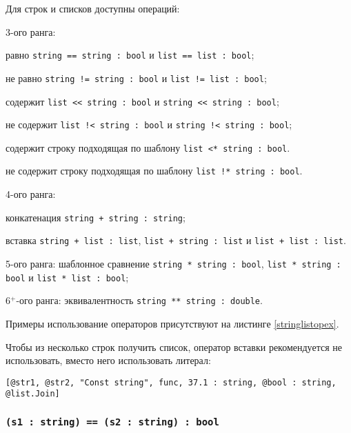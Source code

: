 	Для строк и списков доступны операций:
\begin{icItems}
	\item
		3-ого ранга:
		\begin{icItems}
		\item
			равно \lstinline`string == string : bool` и \lstinline`list == list : bool`;
		\item
			не равно \lstinline`string != string : bool` и \lstinline`list != list : bool`;
		\item
			содержит \lstinline`list << string : bool` и \lstinline`string << string : bool`;
		\item
			не содержит \lstinline`list !< string : bool` и \lstinline`string !< string : bool`;
		\item
			содержит строку подходящая по шаблону \lstinline`list <* string : bool`.
		\item 
			не содержит строку подходящая по шаблону \lstinline`list !* string : bool`.
		\end{icItems}
	\item
		4-ого ранга:
		\begin{icItems}
		\item
			конкатенация \lstinline`string + string : string`;
		\item
			вставка \lstinline`string + list : list`, \lstinline`list + string : list` и \lstinline`list + list : list`.
		\end{icItems}
	\item
		5-ого ранга: шаблонное сравнение \lstinline`string * string : bool`, \lstinline`list * string : bool` и \lstinline`list * list : bool`;
	\item
		6$^+$-ого ранга: эквивалентность \lstinline`string ** string : double`.
\end{icItems}

Примеры использование операторов присутствуют на листинге \ref{stringlistopex}.

Чтобы из несколько строк получить список, оператор вставки рекомендуется не использовать, вместо него использовать литерал:
\begin{lstlisting}[numbers=none]
[@str1, @str2, "Const string", func, 37.1 : string, @bool : string, @list.Join]
\end{lstlisting}

\subsubsection{\lstinline`(s1 : string) == (s2 : string) : bool`}

